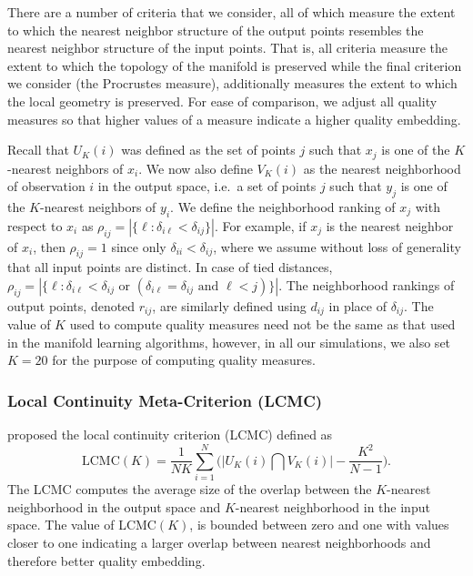 \documentclass[11pt,a4paper,]{article}
\begin{document}
There are a number of criteria that we consider, all of which measure the extent to which the nearest neighbor structure of the output points resembles the nearest neighbor structure of the input points. That is, all criteria measure the extent to which the topology of the manifold is preserved while the final criterion we consider (the Procrustes measure), additionally measures the extent to which the local geometry is preserved. For ease of comparison, we adjust all quality measures so that higher values of a measure indicate a higher quality embedding.

Recall that \(U_K(i)\) was defined as the set of points \(j\) such that \(x_j\) is one of the \(K\)-nearest neighbors of \(x_i\). We now also define \(V_K(i)\) as the nearest neighborhood of observation \(i\) in the output space, i.e.~a set of points \(j\) such that \(y_j\) is one of the \(K\)-nearest neighbors of \(y_i\). We define the neighborhood ranking of \(x_j\) with respect to \(x_i\) as \(\rho_{ij} =|\{\ell: \delta_{i \ell}<\delta_{i j}\} |\). For example, if \(x_j\) is the nearest neighbor of \(x_i\), then \(\rho_{ij}=1\) since only \(\delta_{ii}<\delta_{ij}\), where we assume without loss of generality that all input points are distinct. In case of tied distances, \(\rho_{ij} =\left|\big\{\ell: \delta_{i \ell}<\delta_{i j} \text { or }(\delta_{i \ell}=\delta_{i j} \text { and } \ell<j)\big\}\right|\). The neighborhood rankings of output points, denoted \(r_{ij}\), are similarly defined using \(d_{ij}\) in place of \(\delta_{ij}\). The value of \(K\) used to compute quality measures need not be the same as that used in the manifold learning algorithms, however, in all our simulations, we also set \(K=20\) for the purpose of computing quality measures.

\hypertarget{local-continuity-meta-criterion-lcmc}{%
\subsubsection*{Local Continuity Meta-Criterion (LCMC)}\label{local-continuity-meta-criterion-lcmc}}

\textcite{Chen2009-su} proposed the local continuity criterion (LCMC) defined as
\begin{equation}\label{eq:LCMC}
  \text{LCMC}(K)=\frac{1}{N K} \sum_{i=1}^{N}\Big(\big| U_K(i) \bigcap V_K(i) \big| - \frac{K^{2}}{N-1}\Big).
\end{equation}
The LCMC computes the average size of the overlap between the \(K\)-nearest neighborhood in the output space and \(K\)-nearest neighborhood in the input space. The value of LCMC\((K)\), is bounded between zero and one with values closer to one indicating a larger overlap between nearest neighborhoods and therefore better quality embedding.
\end{document}
